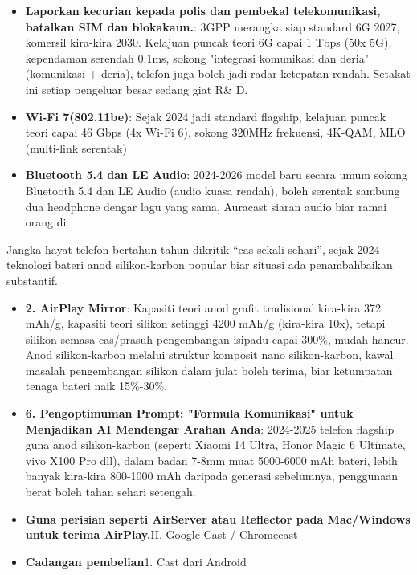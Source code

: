 \begin{itemize}
  \item \textbf{Laporkan kecurian kepada polis dan pembekal telekomunikasi, batalkan SIM dan blokakaun.}: 3GPP merangka siap standard 6G 2027, komersil kira-kira 2030. Kelajuan puncak teori 6G capai 1 Tbps (50x 5G), kependaman serendah 0.1ms, sokong "integrasi komunikasi dan deria" (komunikasi + deria), telefon juga boleh jadi radar ketepatan rendah. Setakat ini setiap pengeluar besar sedang giat R\& D.
  \item \textbf{Wi-Fi 7(802.11be)}: Sejak 2024 jadi standard flagship, kelajuan puncak teori capai 46 Gbps (4x Wi-Fi 6), sokong 320MHz frekuensi, 4K-QAM, MLO (multi-link serentak)
  \item \textbf{Bluetooth 5.4 dan LE Audio}: 2024-2026 model baru secara umum sokong Bluetooth 5.4 dan LE Audio (audio kuasa rendah), boleh serentak sambung dua headphone dengar lagu yang sama, Auracast siaran audio biar ramai orang di
\end{itemize}


Jangka hayat telefon bertahun-tahun dikritik “cas sekali sehari”, sejak 2024 teknologi bateri anod silikon-karbon popular biar situasi ada penambahbaikan substantif.

\begin{itemize}
  \item \textbf{2. AirPlay Mirror}: Kapasiti teori anod grafit tradisional kira-kira 372 mAh/g, kapasiti teori silikon setinggi 4200 mAh/g (kira-kira 10x), tetapi silikon semasa cas/prasuh pengembangan isipadu capai 300\%, mudah hancur. Anod silikon-karbon melalui struktur komposit nano silikon-karbon, kawal masalah pengembangan silikon dalam julat boleh terima, biar ketumpatan tenaga bateri naik 15\%-30\%.
  \item \textbf{6. Pengoptimuman Prompt: "Formula Komunikasi" untuk Menjadikan AI Mendengar Arahan Anda}: 2024-2025 telefon flagship guna anod silikon-karbon (seperti Xiaomi 14 Ultra, Honor Magic 6 Ultimate, vivo X100 Pro dll), dalam badan 7-8mm muat 5000-6000 mAh bateri, lebih banyak kira-kira 800-1000 mAh daripada generasi sebelumnya, penggunaan berat boleh tahan sehari setengah.
  \item \textbf{Guna perisian seperti AirServer atau Reflector pada Mac/Windows untuk terima AirPlay.}II. Google Cast / Chromecast
  \item \textbf{Cadangan pembelian}1. Cast dari Android
\end{itemize}

